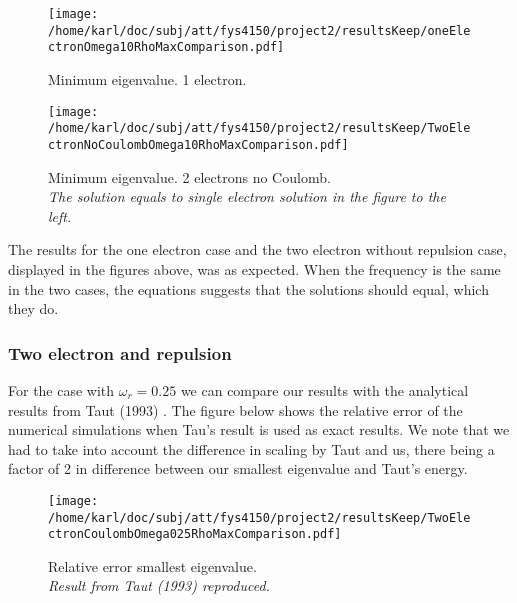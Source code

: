 \documentclass{article}
\begin{document}
\begin{minipage}{.49\textwidth} %
	\begin{figure}[H]
		\centering
		\texttt{[image: /home/karl/doc/subj/att/fys4150/project2/resultsKeep/oneElectronOmega10RhoMaxComparison.pdf]}
		\caption{Minimum eigenvalue. 1 electron.}
		\label{1}
	\end{figure}
\end{minipage}\hfill
\vspace{2ex}
\begin{minipage}{.49\textwidth}
	\begin{figure}[H]
		\centering
		\texttt{[image: /home/karl/doc/subj/att/fys4150/project2/resultsKeep/TwoElectronNoCoulombOmega10RhoMaxComparison.pdf]}
		\caption{Minimum eigenvalue. 2 electrons no Coulomb. \\
			\textit{The solution equals to single electron solution in the figure to the left.}}
		\label{1}
	\end{figure}
\end{minipage}\hfill
\vspace{2ex}

The results for the one electron case and the two electron without repulsion case, displayed in the figures above, was as expected. When the frequency is the same in the two cases, the equations suggests that the solutions should equal, which they do.

\subsubsection{Two electron and repulsion}
For the case with $\omega_r = 0.25$ we can compare our results with the analytical results from Taut (1993) \cite{taut}. The figure below shows the relative error of the numerical simulations when Tau's result is used as exact results. We note that we had to take into account the difference in scaling by Taut and us, there being a factor of 2 in difference between our smallest eigenvalue and Taut's energy.

\begin{figure}[H]
	\centering
	\texttt{[image: /home/karl/doc/subj/att/fys4150/project2/resultsKeep/TwoElectronCoulombOmega025RhoMaxComparison.pdf]}
	\caption{Relative error smallest eigenvalue. \\
		\textit{Result from Taut (1993) \cite{taut} reproduced.}}
	\label{1}
\end{figure}
\end{document}
